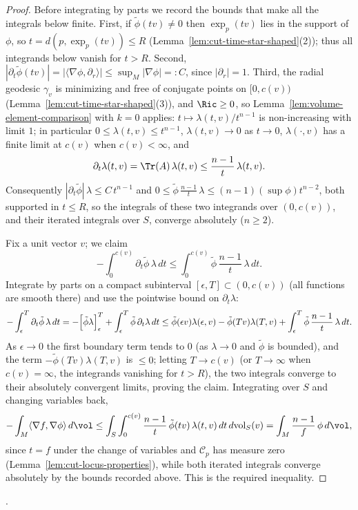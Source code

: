 \begin{proof}
Before integrating by parts we record the bounds that make all the
integrals below finite. First, if $\tilde\phi(tv)\not=0$ then
$\exp_p(tv)$ lies in the support of $\phi$, so
$t=d(p,\exp_p(tv))\le R$ (Lemma~\ref{lem:cut-time-star-shaped}(2));
thus all integrands below vanish for $t>R$. Second,
$|\partial_t\tilde\phi(tv)|=|\langle\nabla\phi,\partial_r\rangle|
\le\sup_M|\nabla\phi|=:C$, since $|\partial_r|=1$. Third, the
radial geodesic $\gamma_v$ is minimizing and free of conjugate
points on $[0,c(v))$ (Lemma~\ref{lem:cut-time-star-shaped}(3)), and
$\Ric\ge0$, so Lemma~\ref{lem:volume-element-comparison} with $k=0$
applies: $t\mapsto\lambda(t,v)/t^{n-1}$ is non-increasing with
limit $1$; in particular $0\le\lambda(t,v)\le t^{n-1}$,
$\lambda(t,v)\to0$ as $t\to0$, $\lambda(\cdot,v)$ has a finite
limit at $c(v)$ when $c(v)<\infty$, and
$$\partial_t\lambda(t,v)=\Tr(A)\,\lambda(t,v)
\le\frac{n-1}{t}\,\lambda(t,v).$$
Consequently $|\partial_t\tilde\phi|\,\lambda\le C\,t^{n-1}$ and
$0\le\tilde\phi\,\frac{n-1}{t}\,\lambda\le(n-1)
\left(\sup\phi\right)t^{n-2}$, both supported in $t\le R$, so the
integrals of these two integrands over $(0,c(v))$, and their
iterated integrals over $S$, converge absolutely ($n\ge2$).

Fix a unit vector $v$; we claim
$$-\int_0^{c(v)}\partial_t\tilde\phi\,\lambda\,dt
\le\int_0^{c(v)}\tilde\phi\,\frac{n-1}{t}\,\lambda\,dt.$$
Integrate by parts on a compact subinterval
$[\epsilon,T]\subset(0,c(v))$ (all functions are smooth there) and
use the pointwise bound on $\partial_t\lambda$:
$$-\int_\epsilon^{T}\partial_t\tilde\phi\,\lambda\,dt
=-\Bigl[\tilde\phi\lambda\Bigr]_{\epsilon}^{T}
+\int_\epsilon^{T}\tilde\phi\,\partial_t\lambda\,dt
\le\tilde\phi(\epsilon v)\lambda(\epsilon,v)
-\tilde\phi(Tv)\lambda(T,v)
+\int_\epsilon^{T}\tilde\phi\,\frac{n-1}{t}\,\lambda\,dt.$$
As $\epsilon\to0$ the first boundary term tends to $0$ (as
$\lambda\to0$ and $\tilde\phi$ is bounded), and the term
$-\tilde\phi(Tv)\lambda(T,v)$ is $\le0$; letting $T\to c(v)$ (or
$T\to\infty$ when $c(v)=\infty$, the integrands vanishing for
$t>R$), the two integrals converge to their absolutely convergent
limits, proving the claim. Integrating
over $S$ and changing variables back,
$$-\int_M\langle\nabla f,\nabla\phi\rangle\,d\vol
\le\int_S\int_0^{c(v)}\frac{n-1}{t}\,
\tilde\phi(tv)\,\lambda(t,v)\,dt\,d\mathrm{vol}_S(v)
=\int_M\frac{n-1}{f}\,\phi\,d\vol,$$
since $t=f$ under the change of variables and ${\mathcal C}_p$ has
measure zero (Lemma~\ref{lem:cut-locus-properties}), while both
iterated integrals converge absolutely by the bounds recorded
above. This is the required inequality.
\end{proof}
.

